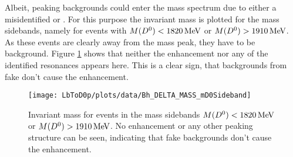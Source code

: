 Albeit, peaking backgrounds could enter the \Dz\proton mass spectrum due to either a misidentified \Dz or \proton.
For this purpose the invariant \Dz\proton mass is plotted for the \Dz mass sidebands, namely for events with $M({{D}^0}) < 1820 \mathrm{\,Me\kern -0.1em V}$ or $M({{D}^0}) > 1910 \mathrm{\,Me\kern -0.1em V}$.
As these events are clearly away from the \Dz mass peak, they have to be background.
Figure \ref{fig:plot_mD0p_mD0Sideband} shows that neither the enhancement nor any of the identified \Lc resonances appears here.
This is a clear sign, that backgrounds from fake \Dz don't cause the enhancement.
\begin{figure}[tb]
	\centering
	\texttt{[image: LbToD0p/plots/data/Bh\_DELTA\_MASS\_mD0Sideband]}
	\caption{Invariant \Dz\proton mass for events in the \Dz mass sidebands $M({{D}^0}) < 1820 \mathrm{\,Me\kern -0.1em V}$ or $M({{D}^0}) > 1910 \mathrm{\,Me\kern -0.1em V}$. No enhancement or any other peaking structure can be seen, indicating that fake \Dz backgrounds don't cause the enhancement.}
	\label{fig:plot_mD0p_mD0Sideband}
\end{figure}

